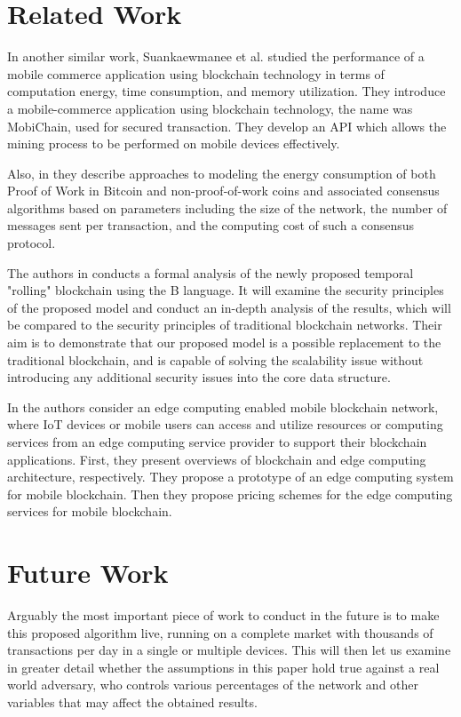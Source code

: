 \documentclass[journal]{IEEEtran}
\begin{document}
\section{Related Work}

In another similar work, Suankaewmanee et al. \cite{Suankaewmanee} studied the performance of a mobile commerce application using blockchain technology in terms of computation energy, time consumption, and memory utilization. They introduce a mobile-commerce application using blockchain technology, the name was MobiChain, used for secured transaction. They develop an API which allows the mining process to be performed on mobile devices effectively.

Also, in \cite{RyanCole} they describe approaches to modeling the energy consumption of both Proof of Work in Bitcoin and non-proof-of-work coins and associated consensus algorithms based on parameters including the size of the network, the number of messages sent per transaction, and the computing cost of such a consensus protocol.

The authors in \cite{RichardDennis} conducts a formal analysis of the newly proposed temporal "rolling" blockchain using the B language. It will examine the security principles of the proposed model and conduct an in-depth analysis of the results, which will be compared to the security principles of traditional blockchain networks. Their aim is to demonstrate that our proposed model is a possible replacement to the traditional blockchain, and is capable of solving the scalability issue without introducing any additional security issues into the core data structure. 

In \cite{Yang} the authors consider an edge computing enabled mobile blockchain network, where IoT devices or mobile users can access and utilize resources or computing services from an edge computing service provider to support their blockchain applications. First, they present overviews of blockchain and edge computing architecture, respectively. They propose a prototype of an edge computing system for mobile blockchain. Then they propose pricing schemes for the edge computing services for mobile blockchain.



\section{Future Work}

Arguably the most important piece of work to conduct in the future is to make this proposed algorithm live, running on a complete market with thousands of transactions per day in a single or multiple devices. This will then let us examine in greater detail whether the assumptions in this paper hold true against a real world adversary, who controls various percentages of the network and other variables that may affect the obtained results.
\end{document}
